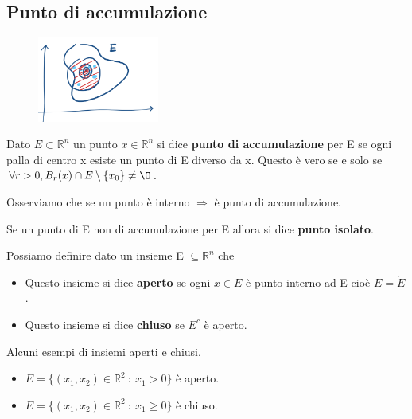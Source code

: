 \subsection{Punto di accumulazione}
\begin{definition}
\end{definition}
\begin{figure}
    \vspace{-45pt}
    \centering
    \includegraphics[width=4cm]{images/punti-accumulazione.png}
\end{figure}
\hspace{-15pt}Dato $E \subset \mathbb{R}^n$ un punto $x \in \mathbb{R}^n$ si dice \textbf{punto di accumulazione} per E se ogni palla di centro x esiste un punto di E diverso da x. Questo è vero se e solo se $\forall r > 0, B_r(x) \cap E \setminus \{x_0\} \neq \O$.

\begin{observation}
Osserviamo che se un punto è interno $\Longrightarrow$ è punto di accumulazione.
\end{observation}

\begin{definition}
Se un punto di E non di accumulazione per E allora si dice \textbf{punto isolato}.
\end{definition}

\begin{definition}
Possiamo definire dato un insieme E $\subseteq \mathbb{R}^n$ che 
\begin{itemize}
    \item Questo insieme si dice \textbf{aperto} se ogni $x \in E$ è punto interno ad E cioè $E= \mathring{E}$.
    \item Questo insieme si dice \textbf{chiuso} se $E^c$ è aperto.
\end{itemize}
\end{definition}

\begin{example}
Alcuni esempi di insiemi aperti e chiusi.
\begin{itemize}
    \item $E= \{(x_1, x_2) \in \mathbb{R}^2 \::\: x_1 > 0\}$ è aperto.
    \item $E = \{(x_1, x_2) \in \mathbb{R}^2 \::\: x_1 \geq 0\}$ è chiuso.
\end{itemize}
\end{example}

